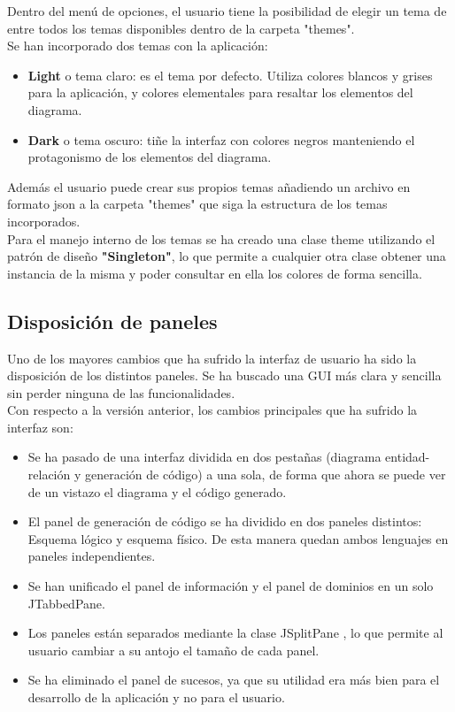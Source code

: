 Dentro del menú de opciones, el usuario tiene la posibilidad de elegir un tema de entre todos los temas disponibles dentro de la carpeta "themes".\\

Se han incorporado dos temas con la aplicación:
\begin{itemize}
    \item \textbf{Light} o tema claro: es el tema por defecto. Utiliza colores blancos y grises para la aplicación, y colores elementales para resaltar los elementos del diagrama.
    \item \textbf{Dark} o tema oscuro: tiñe la interfaz con colores negros manteniendo el protagonismo de los elementos del diagrama.
\end{itemize}

Además el usuario puede crear sus propios temas añadiendo un archivo en formato json a la carpeta "themes" que siga la estructura de los temas incorporados.\\

Para el manejo interno de los temas se ha creado una clase theme utilizando el patrón de diseño \textbf{"Singleton"}\cite{singleton}, lo que permite a cualquier otra clase obtener una instancia de la misma y poder consultar en ella los colores de forma sencilla.

\subsection{Disposición de paneles}
Uno de los mayores cambios que ha sufrido la interfaz de usuario ha sido la disposición de los distintos paneles. Se ha buscado una GUI más clara y sencilla sin perder ninguna de las funcionalidades.\\

Con respecto a la versión anterior, los cambios principales que ha sufrido la interfaz son:
\begin{itemize}
    \item Se ha pasado de una interfaz dividida en dos pestañas (diagrama entidad-relación y generación de código) a una sola, de forma que ahora se puede ver de un vistazo el diagrama y el código generado.
    \item El panel de generación de código se ha dividido en dos paneles distintos: Esquema lógico y esquema físico. De esta manera quedan ambos lenguajes en paneles independientes.
    \item Se han unificado el panel de información y el panel de dominios en un solo JTabbedPane.
    \item Los paneles están separados mediante la clase JSplitPane \cite{split}, lo que permite al usuario cambiar a su antojo el tamaño de cada panel.
    \item Se ha eliminado el panel de sucesos, ya que su utilidad era más bien para el desarrollo de la aplicación y no para el usuario.
\end{itemize}
